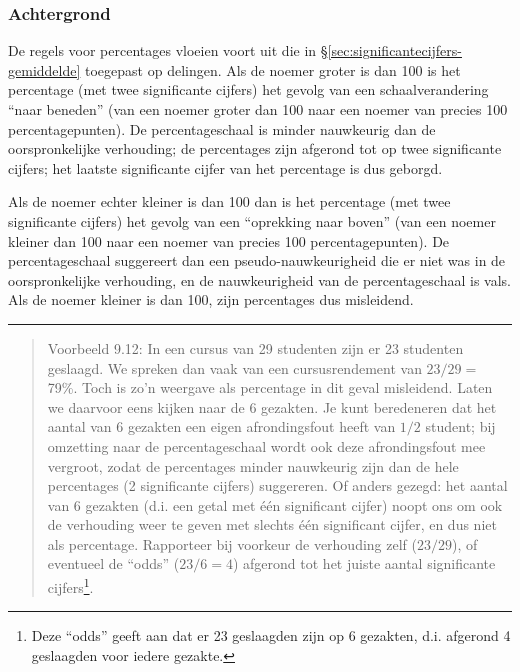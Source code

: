 \documentclass[
]{book}
\begin{document}
\subsubsection{Achtergrond}\label{achtergrond-1}

De regels voor percentages vloeien voort uit die in
§\ref{sec:significantecijfers-gemiddelde} toegepast op delingen.
Als de noemer groter is dan 100 is het percentage (met twee significante
cijfers) het gevolg van een schaalverandering ``naar beneden'' (van een
noemer groter dan 100 naar een noemer van precies 100 percentagepunten).
De percentageschaal is minder nauwkeurig dan de oorspronkelijke
verhouding; de percentages zijn afgerond tot op twee significante
cijfers; het laatste significante cijfer van het percentage is dus
geborgd.

Als de noemer echter kleiner is dan 100 dan is het percentage (met twee
significante cijfers) het gevolg van een ``oprekking naar boven'' (van een
noemer kleiner dan 100 naar een noemer van precies 100
percentagepunten). De percentageschaal suggereert dan een
pseudo-nauwkeurigheid die er niet was in de oorspronkelijke verhouding,
en de nauwkeurigheid van de percentageschaal is vals. Als de noemer
kleiner is dan 100, zijn percentages dus misleidend.

\begin{center}\rule{0.5\linewidth}{0.5pt}\end{center}

\begin{quote}
Voorbeeld 9.12:
In een cursus van 29 studenten zijn er 23 studenten geslaagd. We spreken
dan vaak van een cursusrendement van \(23/29=\) 79\%. Toch is zo'n weergave
als percentage in dit geval misleidend. Laten we daarvoor eens kijken
naar de 6 gezakten. Je kunt beredeneren dat het aantal van 6 gezakten
een eigen afrondingsfout heeft van \(1/2\) student; bij omzetting naar de
percentageschaal wordt ook deze afrondingsfout mee vergroot, zodat de
percentages minder nauwkeurig zijn dan de hele percentages (2
significante cijfers) suggereren. Of anders gezegd: het aantal van 6
gezakten (d.i. een getal met één significant cijfer) noopt ons om ook de
verhouding weer te geven met slechts één significant cijfer, en dus niet
als percentage. Rapporteer bij voorkeur de verhouding zelf (\(23/29\)), of
eventueel de ``odds'' (\(23/6=4\)) afgerond tot het juiste aantal
significante cijfers\footnote{Deze ``odds'' geeft aan dat er 23 geslaagden zijn op 6 gezakten, d.i. afgerond 4 geslaagden voor iedere gezakte.}.
\end{quote}
\end{document}
